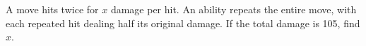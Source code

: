 A move hits twice for $ x $ damage per hit. An ability repeats the entire move, with each repeated hit dealing half its original damage. If the total damage is 105, find $ x $.
